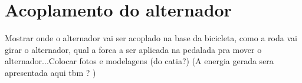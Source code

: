 \section{Acoplamento do alternador}
Mostrar onde o alternador vai ser acoplado na base da bicicleta, como a roda vai girar o alternador, qual a forca a ser aplicada na pedalada pra mover o alternador...Colocar fotos e modelagens (do catia?)
(A energia gerada sera apresentada aqui tbm ? )